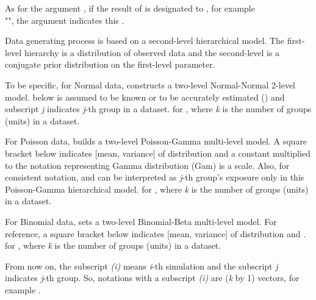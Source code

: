 \documentclass[a4paper]{book}
\begin{document}
\begin{Details}\relax
As for the argument , if the result of  is designated to 
, for example \\{} "", the argument  indicates this .

Data generating process is based on a second-level hierarchical model. The first-level hierarchy is 
a distribution of observed data and the second-level is a conjugate prior distribution 
on the first-level parameter.

To be specific, for Normal data,  constructs a two-level Normal-Normal 2-level model.  below is assumed to be known or to be accurately estimated () and subscript \emph{j} indicates \emph{j}-th group in a dataset.
for , where \emph{k} is the number of groups (units) in a dataset.

For Poisson data,  builds a two-level Poisson-Gamma multi-level model. A square bracket below indicates [mean, variance] of distribution and a constant multiplied to the notation representing Gamma distribution (Gam) is a scale. Also, for consistent notation,  and  can be interpreted as \emph{j}-th group's exposure only in this Poisson-Gamma hierarchical model.
for , where \emph{k} is the number of groups (units) in a dataset.

For Binomial data,  sets a two-level Binomial-Beta multi-level model. For reference, a square bracket below indicates [mean, variance] of distribution and .
for , where \emph{k} is the number of groups (units) in a dataset.

From now on, the subscript \emph{(i)} means \emph{i}-th simulation and the subscript \emph{j} indicates \emph{j}-th group. So, notations with a subscript \emph{(i)} are (\emph{k} by 1) vectors, for example .


\end{Details}
\end{document}
